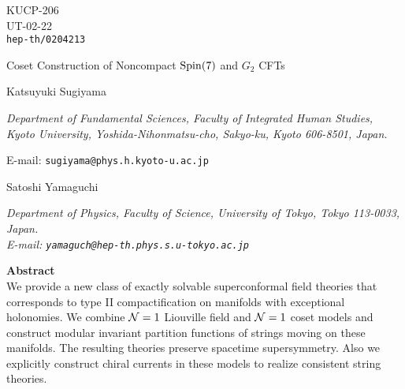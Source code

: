 \documentclass[a4paper,12pt]{article}
\numberwithin{equation}{section}
\newcommand{\Ncal}{{\cal N}}
\newcommand{\G}[1]{\mbox{$G_{#1}$}}
\newcommand{\Spin}[1]{{\rm Spin}(#1)}
\begin{document}
\thispagestyle{empty}
\begin{flushright}
 \parbox{3.5cm}{KUCP-206\\ UT-02-22 \\
  {\tt hep-th/0204213}}
\end{flushright}

\vspace*{1cm}
\begin{center}
 {\Large
    Coset Construction of Noncompact $\Spin7$ and \G2 CFTs
 }
\end{center}

\vspace*{2cm} 
\begin{center}
 \noindent
 {\large Katsuyuki Sugiyama}

 \vspace{5mm}
 \noindent
 \hspace{0.7cm} \parbox{142mm}{\it
 Department of Fundamental Sciences, Faculty of Integrated Human Studies,
 Kyoto University, Yoshida-Nihonmatsu-cho,
 Sakyo-ku, Kyoto 606-8501, Japan.

 E-mail: {\tt sugiyama@phys.h.kyoto-u.ac.jp}
 }
\end{center}

 \vspace{5mm}
\begin{center}
 \noindent
 {\large Satoshi Yamaguchi}

 \vspace{5mm}
 \noindent
 \hspace{0.7cm} \parbox{142mm}{\it
 Department of Physics, Faculty of Science, University of Tokyo,
 Tokyo 113-0033, Japan.\\
 E-mail: {\tt yamaguch@hep-th.phys.s.u-tokyo.ac.jp}
}
\end{center}


\vspace{2cm}
\hfill{\bf Abstract\ \ }\hfill\ \\
We provide a new class of exactly solvable superconformal field theories 
that corresponds to type II compactification on manifolds with
exceptional holonomies. We combine $\Ncal=1$ Liouville field and $\Ncal=1$ 
coset models and construct modular invariant partition functions of
strings moving on these manifolds.
The resulting theories preserve spacetime
supersymmetry. Also we explicitly construct chiral currents 
in these models to realize consistent string theories.
\end{document}
